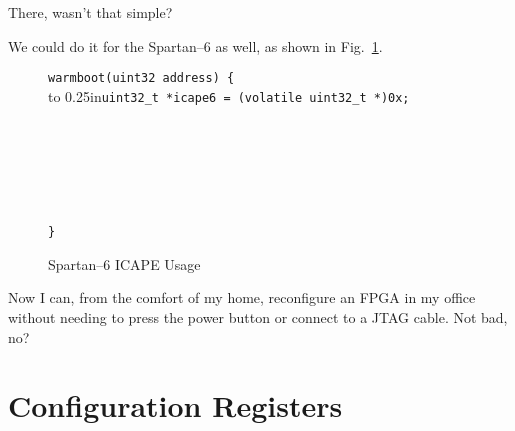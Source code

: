 \documentclass{gqtekspec}
\begin{document}
There, wasn't that simple?

We could do it for the Spartan--6 as well, as shown in Fig.~\ref{fig:sp6boot}.
\begin{figure}\begin{center}\begin{tabbing}
{\tt warmboot(uint32 address) \{} \\
\hbox to 0.25in{}\={\tt uint32\_t *icape6 = (volatile uint32\_t *)0x{\em <ICAPE port address>};}\\
 \\
 \\
 \\
 \\
 \\
 \\
{\tt \}}
\end{tabbing}
\caption{Spartan--6 ICAPE Usage}\label{fig:sp6boot}
\end{center}\end{figure}

Now I can, from the comfort of my home, reconfigure an FPGA in my office without
needing to press the power button or connect to a JTAG cable.  Not bad, no?

\iffalse
\chapter{Configuration Registers}\label{chap:registers}
\end{document}
